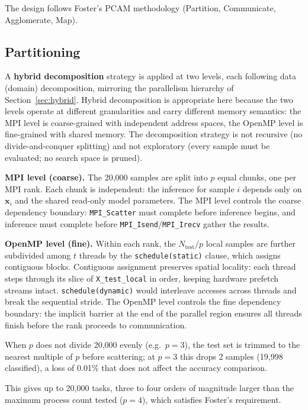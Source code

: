 \documentclass[12pt,a4paper]{article}
\begin{document}
The design follows Foster's PCAM methodology (Partition, Communicate,
Agglomerate, Map).

\subsection{Partitioning}

A \textbf{hybrid decomposition} strategy is applied at two levels, each
following data (domain) decomposition, mirroring the parallelism hierarchy
of Section~\ref{sec:hybrid}. Hybrid decomposition is appropriate here
because the two levels operate at different granularities and carry different
memory semantics: the MPI level is coarse-grained with independent address
spaces, the OpenMP level is fine-grained with shared memory. The decomposition
strategy is not recursive (no divide-and-conquer splitting) and not
exploratory (every sample must be evaluated; no search space is pruned).

\textbf{MPI level (coarse).}
The 20{,}000 samples are split into $p$ equal chunks, one per MPI rank.
Each chunk is independent: the inference for sample $i$ depends only on
$\mathbf{x}_i$ and the shared read-only model parameters. The MPI level
controls the coarse dependency boundary: \texttt{MPI\_Scatter} must
complete before inference begins, and inference must complete before
\texttt{MPI\_Isend}/\texttt{MPI\_Irecv} gather the results.

\textbf{OpenMP level (fine).}
Within each rank, the $N_\text{test}/p$ local samples are further subdivided
among $t$ threads by the \texttt{schedule(static)} clause, which assigns
contiguous blocks. Contiguous assignment preserves spatial locality: each
thread steps through its slice of \texttt{X\_test\_local} in order, keeping
hardware prefetch streams intact. \texttt{schedule(dynamic)} would interleave
accesses across threads and break the sequential stride. The OpenMP level
controls the fine dependency boundary: the implicit barrier at the end of
the parallel region ensures all threads finish before the rank proceeds to
communication.

When $p$ does not divide 20{,}000 evenly (e.g.\ $p=3$), the test set is
trimmed to the nearest multiple of $p$ before scattering; at $p=3$ this drops
2 samples (19{,}998 classified), a loss of 0.01\% that does not affect the
accuracy comparison.

This gives up to 20{,}000 tasks, three to four orders of magnitude larger
than the maximum process count tested ($p=4$), which satisfies Foster's
requirement.
\end{document}
